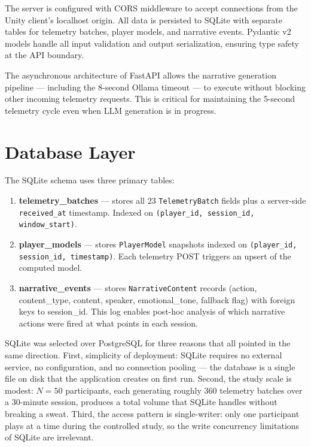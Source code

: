The server is configured with CORS middleware to accept connections from the Unity client's localhost origin. All data is persisted to SQLite with separate tables for telemetry batches, player models, and narrative events. Pydantic v2 models handle all input validation and output serialization, ensuring type safety at the API boundary.

The asynchronous architecture of FastAPI allows the narrative generation pipeline --- including the 8-second Ollama timeout --- to execute without blocking other incoming telemetry requests. This is critical for maintaining the 5-second telemetry cycle even when LLM generation is in progress.

\section{Database Layer}

The SQLite schema uses three primary tables:

\begin{enumerate}
\item \textbf{telemetry\_batches} --- stores all 23 \texttt{TelemetryBatch} fields plus a server-side \texttt{received\_at} timestamp. Indexed on \texttt{(player\_id, session\_id, window\_start)}.
\item \textbf{player\_models} --- stores \texttt{PlayerModel} snapshots indexed on \texttt{(player\_id, session\_id, timestamp)}. Each telemetry POST triggers an upsert of the computed model.
\item \textbf{narrative\_events} --- stores \texttt{NarrativeContent} records (action, content\_type, content, speaker, emotional\_tone, fallback flag) with foreign keys to session\_id. This log enables post-hoc analysis of which narrative actions were fired at what points in each session.
\end{enumerate}

SQLite was selected over PostgreSQL for three reasons that all pointed in the same direction. First, simplicity of deployment: SQLite requires no external service, no configuration, and no connection pooling --- the database is a single file on disk that the application creates on first run. Second, the study scale is modest: $N = 50$ participants, each generating roughly 360 telemetry batches over a 30-minute session, produces a total volume that SQLite handles without breaking a sweat. Third, the access pattern is single-writer: only one participant plays at a time during the controlled study, so the write concurrency limitations of SQLite are irrelevant.

